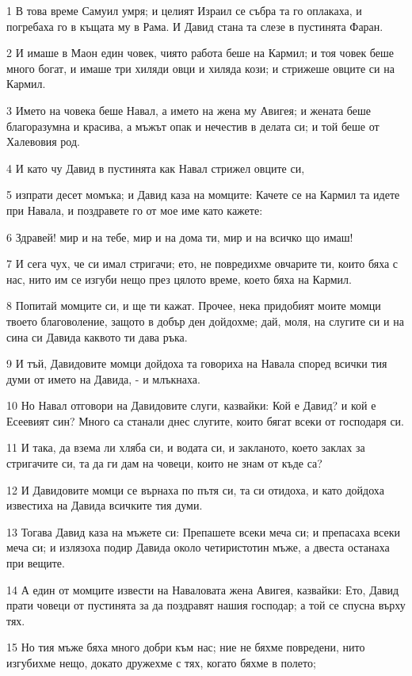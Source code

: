\par 1 В това време Самуил умря; и целият Израил се събра та го оплакаха, и погребаха го в къщата му в Рама. И Давид стана та слезе в пустинята Фаран.
\par 2 И имаше в Маон един човек, чиято работа беше на Кармил; и тоя човек беше много богат, и имаше три хиляди овци и хиляда кози; и стрижеше овците си на Кармил.
\par 3 Името на човека беше Навал, а името на жена му Авигея; и жената беше благоразумна и красива, а мъжът опак и нечестив в делата си; и той беше от Халевовия род.
\par 4 И като чу Давид в пустинята как Навал стрижел овците си,
\par 5 изпрати десет момъка; и Давид каза на момците: Качете се на Кармил та идете при Навала, и поздравете го от мое име като кажете:
\par 6 Здравей! мир и на тебе, мир и на дома ти, мир и на всичко що имаш!
\par 7 И сега чух, че си имал стригачи; ето, не повредихме овчарите ти, които бяха с нас, нито им се изгуби нещо през цялото време, което бяха на Кармил.
\par 8 Попитай момците си, и ще ти кажат. Прочее, нека придобият моите момци твоето благоволение, защото в добър ден дойдохме; дай, моля, на слугите си и на сина си Давида каквото ти дава ръка.
\par 9 И тъй, Давидовите момци дойдоха та говориха на Навала според всички тия думи от името на Давида, - и млъкнаха.
\par 10 Но Навал отговори на Давидовите слуги, казвайки: Кой е Давид? и кой е Есеевият син? Много са станали днес слугите, които бягат всеки от господаря си.
\par 11 И така, да взема ли хляба си, и водата си, и закланото, което заклах за стригачите си, та да ги дам на човеци, които не знам от къде са?
\par 12 И Давидовите момци се върнаха по пътя си, та си отидоха, и като дойдоха известиха на Давида всичките тия думи.
\par 13 Тогава Давид каза на мъжете си: Препашете всеки меча си; и препасаха всеки меча си; и излязоха подир Давида около четиристотин мъже, а двеста останаха при вещите.
\par 14 А един от момците извести на Наваловата жена Авигея, казвайки: Ето, Давид прати човеци от пустинята за да поздравят нашия господар; а той се спусна върху тях.
\par 15 Но тия мъже бяха много добри към нас; ние не бяхме повредени, нито изгубихме нещо, докато дружехме с тях, когато бяхме в полето;
